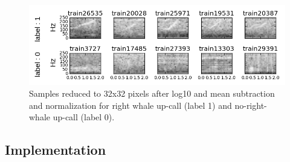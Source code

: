 \documentclass[]{article}
\begin{document}
\begin{figure}[htpb!]
\centering
\includegraphics[width= \textwidth]{./images/2_samples_cropped}
\caption{Samples reduced to 32x32 pixels after log10 and mean subtraction and normalization for right whale up-call (label 1) and no-right-whale up-call (label 0).  \label{img:samples_processed}}
\end{figure} 


\subsection{Implementation}\label{implementation}
\end{document}
